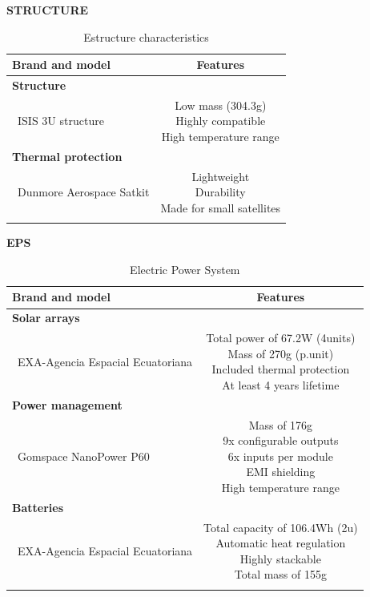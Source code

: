 \textbf{STRUCTURE}
\begin{longtable}{| l | c  }
	\hline
	\rowcolor[gray]{0.80}	\textbf{Brand and model} &  \textbf{Features}     \\
	\hline
	\endfirsthead
	
	\rowcolor[gray]{0.85} \textbf{Structure} &  \\
	~ISIS 3U structure & \makecell{Low mass (304.3g) \\ Highly compatible \\ High temperature range}\\
	\hline
	\rowcolor[gray]{0.85} \textbf{Thermal protection} &  \\
	~Dunmore Aerospace Satkit & \makecell{Lightweight \\ Durability \\ Made for small satellites}\\
	\hline
		
	\caption{Estructure characteristics}
	\label{structureoptions}
\end{longtable}

\textbf{EPS}
\begin{longtable}{| l | c | }
	\hline
	\rowcolor[gray]{0.80}	\textbf{Brand and model} &  \textbf{Features}     \\
	\hline
	\endfirsthead
	
	\rowcolor[gray]{0.85} \textbf{Solar arrays} &  \\
	~EXA-Agencia Espacial Ecuatoriana & \makecell{Total power of 67.2W (4units)\\ Mass of 270g (p.unit) \\ Included thermal protection \\At least 4 years lifetime}  \\
	\hline
	\rowcolor[gray]{0.85} \textbf{Power management} &   \\
	~Gomspace NanoPower P60 & \makecell{Mass of 176g \\ 9x configurable outputs \\ 6x inputs per module \\ EMI shielding \\ High temperature range} \\
	\hline
	\rowcolor[gray]{0.85} \textbf{Batteries} &   \\
	~EXA-Agencia Espacial Ecuatoriana & \makecell{Total capacity of 106.4Wh (2u)\\ Automatic heat regulation \\ Highly stackable \\ Total mass of 155g} \\
	\hline
	
	\caption{Electric Power System}
	\label{epsoptions}
\end{longtable}

